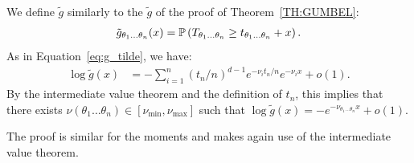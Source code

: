 \documentclass{aptpub}
\newcommand\proba[1]{\mathchoice{\bproba{#1}}{\sproba{#1}}{\sproba{#1}}{\sproba{#1}}}
\newcommand\bproba[1]{\mathbb{P}\left(#1\right)}
\newcommand\sproba[1]{\mathbb{P}(#1)}
\begin{document}
We define $\tilde g$ similarly to the $\tilde g$ of the proof of
Theorem~\ref{TH:GUMBEL}:
\begin{align*}
  \tilde g_{\theta_1\dots\theta_n}(x) = \proba{T_{\theta_1\dots\theta_n}\ge t_{\theta_1\dots\theta_n} + x}. 
\end{align*}
As in Equation~\eqref{eq:g_tilde}, we have:
\begin{align*}
  \log \tilde g(x) 
  &= - \sum_{i=1}^n (t_n/n)^{d-1} e^{-\nu_i t_n/n} e^{-\nu_i x} + o(1).
\end{align*}
By the intermediate value theorem and the definition of $t_n$, this
implies that there exists
$\nu(\theta_1\dots\theta_n)\in[\nu_{\min},\nu_{\max}]$ such that
$ \log \tilde g(x) = - e^{-\nu_{\theta_1\dots\theta_n} x} + o(1)$. 

The proof is similar for the moments and makes again use of the
intermediate value theorem.




\end{document}
